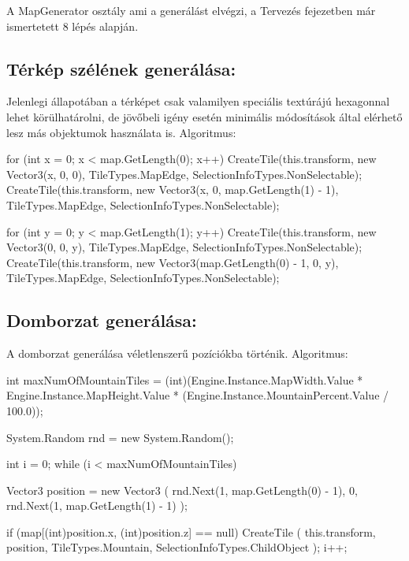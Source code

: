 \noindent A MapGenerator osztály ami a generálást elvégzi, a Tervezés fejezetben már ismertetett 8 lépés alapján.

\subsection{Térkép szélének generálása:}

Jelenlegi állapotában a térképet csak valamilyen speciális textúrájú hexagonnal lehet körülhatárolni, de jövőbeli igény esetén minimális módosítások által elérhető lesz más objektumok használata is. 
\newline
\newline Algoritmus:

\begin{cpp}
for (int x = 0; x < map.GetLength(0); x++)
{
   CreateTile(this.transform, new Vector3(x, 0, 0),
   TileTypes.MapEdge, SelectionInfoTypes.NonSelectable);
   CreateTile(this.transform, new Vector3(x, 0, map.GetLength(1) - 1),
   TileTypes.MapEdge, SelectionInfoTypes.NonSelectable);
}

for (int y = 0; y < map.GetLength(1); y++)
{
   CreateTile(this.transform, new Vector3(0, 0, y),
   TileTypes.MapEdge, SelectionInfoTypes.NonSelectable);
   CreateTile(this.transform, new Vector3(map.GetLength(0) - 1, 0, y),
   TileTypes.MapEdge, SelectionInfoTypes.NonSelectable);
}
\end{cpp}

\subsection{Domborzat generálása:}

A domborzat generálása véletlenszerű pozíciókba történik.
\newline
\newline Algoritmus:

\begin{cpp}
int maxNumOfMountainTiles = 
(int)(Engine.Instance.MapWidth.Value * Engine.Instance.MapHeight.Value * 
(Engine.Instance.MountainPercent.Value / 100.0));

System.Random rnd = new System.Random();

int i = 0;
while (i < maxNumOfMountainTiles)
{
   Vector3 position = new Vector3
   (
      rnd.Next(1, map.GetLength(0) - 1),
      0, rnd.Next(1, map.GetLength(1) - 1)
   );

   if (map[(int)position.x, (int)position.z] == null)
   {
      CreateTile
      (
         this.transform, position, TileTypes.Mountain, 
         SelectionInfoTypes.ChildObject
      );
      i++;
   }
}
\end{cpp}


